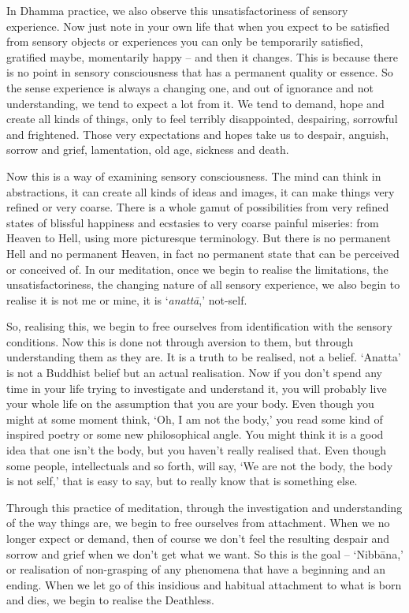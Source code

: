 In Dhamma practice, we also observe this unsatisfactoriness of sensory experience. Now just note in your own life that when you expect to be satisfied from sensory objects or experiences you can only be temporarily satisfied, gratified maybe, momentarily happy -- and then it changes. This is because there is no point in sensory consciousness that has a permanent quality or essence. So the sense experience is always a changing one, and out of ignorance and not understanding, we tend to expect a lot from it. We tend to demand, hope and create all kinds of things, only to feel terribly disappointed, despairing, sorrowful and frightened. Those very expectations and hopes take us to despair, anguish, sorrow and grief, lamentation, old age, sickness and death.

Now this is a way of examining sensory consciousness. The mind can think in abstractions, it can create all kinds of ideas and images, it can make things very refined or very coarse. There is a whole gamut of possibilities from very refined states of blissful happiness and ecstasies to very coarse painful miseries: from Heaven to Hell, using more picturesque terminology. But there is no permanent Hell and no permanent Heaven, in fact no permanent state that can be perceived or conceived of. In our meditation, once we begin to realise the limitations, the unsatisfactoriness, the changing nature of all sensory experience, we also begin to realise it is not me or mine, it is `\textit{anattā},' not-self.

So, realising this, we begin to free ourselves from identification with the sensory conditions. Now this is done not through aversion to them, but through understanding them as they are. It is a truth to be realised, not a belief. `Anatta' is not a Buddhist belief but an actual realisation. Now if you don't spend any time in your life trying to investigate and understand it, you will probably live your whole life on the assumption that you are your body. Even though you might at some moment think, `Oh, I am not the body,' you read some kind of inspired poetry or some new philosophical angle. You might think it is a good idea that one isn't the body, but you haven't really realised that. Even though some people, intellectuals and so forth, will say, `We are not the body, the body is not self,' that is easy to say, but to really know that is something else.

Through this practice of meditation, through the investigation and understanding of the way things are, we begin to free ourselves from attachment. When we no longer expect or demand, then of course we don't feel the resulting despair and sorrow and grief when we don't get what we want. So this is the goal -- `Nibbāna,' or realisation of non-grasping of any phenomena that have a beginning and an ending. When we let go of this insidious and habitual attachment to what is born and dies, we begin to realise the Deathless.

